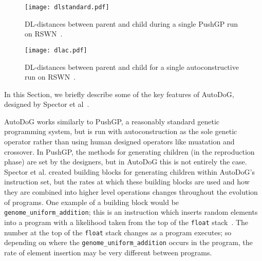 \documentclass{sig-alternate}
\begin{document}
\begin{figure*}
	\centering
	\begin{minipage}[b]{0.4\textwidth}
		\texttt{[image: dlstandard.pdf]}
		\caption{DL-distances between parent and child during a single PushGP run on RSWN~\cite{spector:2016}.}
		\label{fig:standard}
	\end{minipage}
	\hfill
	\begin{minipage}[b]{0.4\textwidth}
		\texttt{[image: dlac.pdf]}
		\caption{DL-distances between parent and child for a single autoconstructive run on RSWN~\cite{spector:2016}.}
		\label{fig:ac}
	\end{minipage}
\end{figure*}

In this Section, we briefly describe some of the key features of AutoDoG, designed by Spector et al~\cite{spector:2016}.


AutoDoG works similarly to PushGP, a reasonably standard genetic programming system, but is run with autoconstruction as the sole genetic operator rather than using human designed operators like muatation and crossover. In PushGP, the methods for generating children (in the reproduction phase) are set by the designers, but in AutoDoG this is not entirely the case. Spector et al. created building blocks for generating children within AutoDoG's instruction set, but the rates at which these building blocks are used and how they are combined into higher level operations changes throughout the evolution of programs. One example of a building block would be \texttt{genome\_uniform\_addition}; this is an instruction which inserts random elements into a program with a likelihood taken from the top of the \texttt{float} stack~\cite{clojush}. The number at the top of the \texttt{float} stack changes as a program executes; so depending on where the \texttt{genome\_unif\-orm\_addition} occurs in the program, the rate of element insertion may be very different between programs.~\cite{spector:2016}
\end{document}
